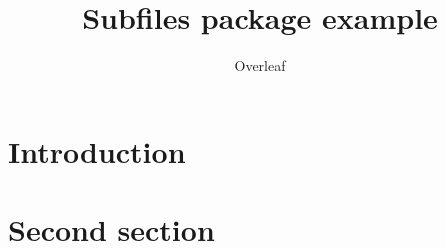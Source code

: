 \documentclass{article}
\title{Subfiles package example}
\author{Overleaf}
\date{ }
\begin{document}
\maketitle

\section{Introduction}



\section{Second section}


\end{document}
